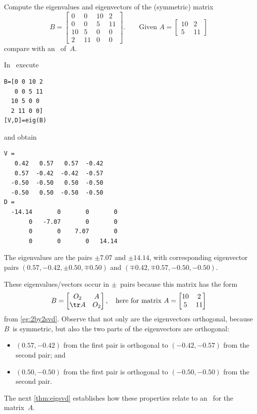 \begin{example} \label{eg:eigsvd}
Compute the eigenvalues and eigenvectors of the (symmetric) matrix
\begin{equation*}
B=\begin{bmatrix} 0&0&10&2\\
0&0&5&11\\
10&5&0&0\\
2&11&0&0 \end{bmatrix}.
\qquad \text{Given }A=\begin{bmatrix} 10&2\\5&11 \end{bmatrix}
\end{equation*}
compare with an \svd\ of~\(A\).
\begin{solution} In \script\ execute
\setbox\ajrqrbox\hbox{}%
\marginpar{\usebox{\ajrqrbox}}%
\begin{verbatim}
B=[0 0 10 2
   0 0 5 11
  10 5 0 0
  2 11 0 0]
[V,D]=eig(B)
\end{verbatim}
and obtain \twodp
\begin{verbatim}
V =
   0.42   0.57   0.57  -0.42
   0.57  -0.42  -0.42  -0.57
  -0.50  -0.50   0.50  -0.50
  -0.50   0.50  -0.50  -0.50
D =
  -14.14       0       0       0
       0   -7.07       0       0
       0       0    7.07       0
       0       0       0   14.14
\end{verbatim}
The eigenvalues are the pairs \(\pm7.07\) and \(\pm14.14\), with corresponding eigenvector pairs \((0.57,-0.42,\pm0.50,\mp0.50)\) and \((\mp0.42,\mp0.57,-0.50,-0.50)\).
\end{solution}
These eigenvalues\slash vectors occur in \(\pm\)~pairs because this matrix has the form
\begin{equation*}
B=\begin{bmatrix} O_2& A\\ \tr A&O_2\end{bmatrix},
\quad\text{here for matrix }
A=\begin{bmatrix} 10&2\\5&11 \end{bmatrix}
\end{equation*}
from \autoref{eg:2by2svd}.
Observe that not only are the eigenvectors orthogonal, because \(B\)~is symmetric, but also the two parts of the eigenvectors are orthogonal:  
\begin{itemize}
\item \((0.57,-0.42)\) from the first pair is orthogonal to \((-0.42,-0.57)\) from the second pair; and 
\item \((0.50,-0.50)\) from the first pair is orthogonal to \((-0.50,-0.50)\) from the second pair.
\end{itemize}
The next \autoref{thm:eigsvd} establishes how these properties relate to an \svd\ for the matrix~\(A\).
\end{example}



